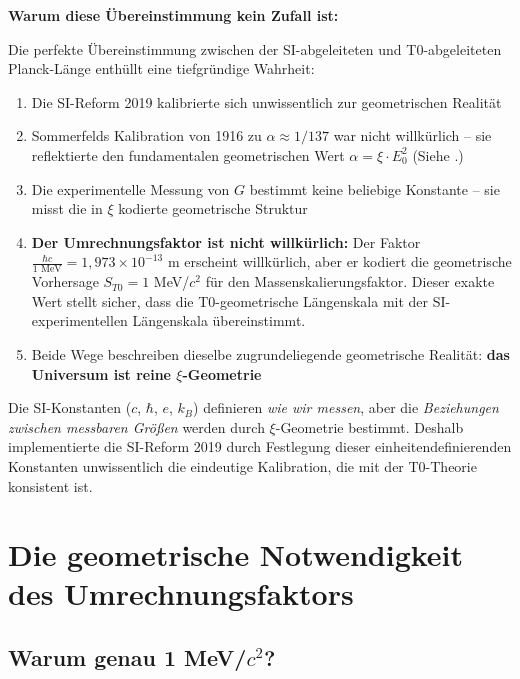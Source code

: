 	\begin{warning}
		\textbf{Warum diese Übereinstimmung kein Zufall ist:}
		
		Die perfekte Übereinstimmung zwischen der SI-abgeleiteten und T0-abgeleiteten Planck-Länge enthüllt eine tiefgründige Wahrheit:
		
		\begin{enumerate}
			\item Die SI-Reform 2019 kalibrierte sich unwissentlich zur geometrischen Realität
			
			\item Sommerfelds Kalibration von 1916 zu $\alpha \approx 1/137$ war nicht willkürlich -- sie reflektierte den fundamentalen geometrischen Wert $\alpha = \xi \cdot E_0^2$ (Siehe \cite{T0_Feinstruktur_De}.)
			
			\item Die experimentelle Messung von $G$ bestimmt keine beliebige Konstante -- sie misst die in $\xi$ kodierte geometrische Struktur
			
			\item \textbf{Der Umrechnungsfaktor ist nicht willkürlich:} Der Faktor $\frac{\hbar c}{1 \text{ MeV}} = 1{,}973 \times 10^{-13}$ m erscheint willkürlich, aber er kodiert die geometrische Vorhersage $S_{T0} = 1$ MeV/$c^2$ für den Massenskalierungsfaktor. Dieser exakte Wert stellt sicher, dass die T0-geometrische Längenskala mit der SI-experimentellen Längenskala übereinstimmt.
			
			\item Beide Wege beschreiben dieselbe zugrundeliegende geometrische Realität: \textbf{das Universum ist reine $\xi$-Geometrie}
		\end{enumerate}
		
		Die SI-Konstanten ($c$, $\hbar$, $e$, $k_B$) definieren \emph{wie wir messen}, aber die \emph{Beziehungen zwischen messbaren Größen} werden durch $\xi$-Geometrie bestimmt. Deshalb implementierte die SI-Reform 2019 durch Festlegung dieser einheitendefinierenden Konstanten unwissentlich die eindeutige Kalibration, die mit der T0-Theorie konsistent ist.
	\end{warning}
	
	\section{Die geometrische Notwendigkeit des Umrechnungsfaktors}
	
	\subsection{Warum genau 1 MeV/$c^2$?}
	
